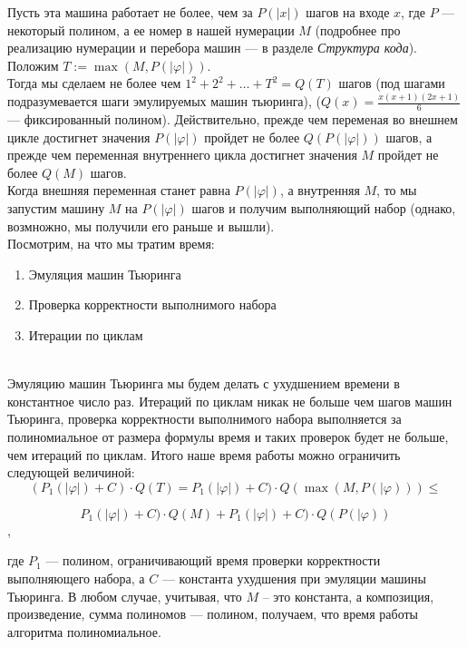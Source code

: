 \documentclass{amsart}
\theoremstyle{definition}
\theoremstyle{remark}
\numberwithin{equation}{section}
\begin{document}
Пусть эта машина работает не более, чем за $P(|x|)$ шагов на входе $x$, где $P$
--- некоторый полином, а ее номер в нашей нумерации $M$
(подробнее про реализацию нумерации и перебора машин ---
 в разделе \textit{Структура кода}).\\


Положим $T := \max(M, P(|\varphi|))$.\\


Тогда мы сделаем не более чем
$1^2 + 2^2 + \ldots + T^2 = Q(T)$ шагов (под шагами подразумевается шаги
эмулируемых машин тьюринга),
($Q(x) = \frac{x(x + 1)(2x + 1)}{6}$ --- фиксированный полином). Действительно,
прежде чем переменая во внешнем цикле достигнет значения $P(|\varphi|)$ пройдет
не более $Q(P(|\varphi|))$ шагов, а прежде чем переменная внутреннего цикла
достигнет значения $M$ пройдет не более $Q(M)$ шагов.\\


Когда внешняя переменная станет равна $P(|\varphi|)$, а внутренняя $M$, то мы
запустим машину $M$ на $P(|\varphi|)$ шагов и получим выполняющий набор
(однако, возмножно, мы получили его раньше и вышли).\\


Посмотрим, на что мы тратим время:\\


\begin{enumerate}
\item Эмуляция машин Тьюринга
\item Проверка корректности выполнимого набора
\item Итерации по циклам
\end{enumerate}\\


Эмуляцию машин Тьюринга мы будем делать с ухудшением времени в константное число
раз. Итераций по циклам никак не больше чем шагов машин Тьюринга, проверка
корректности выполнимого набора выполняется за полиномиальное от размера формулы
время и таких проверок будет не больше, чем итераций по циклам. Итого наше время
работы можно ограничить следующей величиной:\\


$$(P_1(|\varphi|)  + C)\cdot Q(T) =
    P_1(|\varphi|) + C)\cdot Q(\max(M, P(|\varphi))) \leq$$

$$P_1(|\varphi|) + C)\cdot Q(M) + P_1(|\varphi|) + C)\cdot Q(P(|\varphi))$$,


где $P_1$ --- полином, ограничивающий время проверки корректности выполняющего
набора, а $C$ --- константа ухудшения при эмуляции машины Тьюринга.
В любом случае, учитывая, что $M$ -- это константа, а композиция, произведение,
сумма полиномов --- полином, получаем, что время работы
алгоритма полиномиальное.\\
\end{document}
